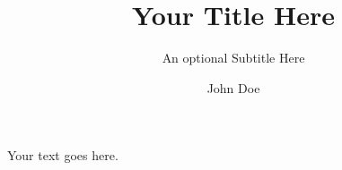 \documentclass[a4paper]{article}
\title{Your Title Here}
\subtitle{An optional Subtitle Here}
\author{John Doe}
\begin{document}
\maketitle

Your text goes here.
\end{document}
